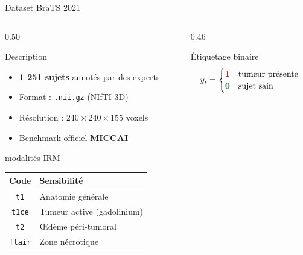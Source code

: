\documentclass[aspectratio=169, 12pt]{beamer}
\begin{document}
\begin{frame}{Dataset BraTS 2021}
  \begin{columns}[T]

    \begin{column}{0.50\textwidth}
      \begin{block}{\faDatabase\; Description}
        \begin{itemize}
          \item \textbf{1 251 sujets} annotés par des experts
          \item Format : \texttt{.nii.gz} (NIfTI 3D)
          \item Résolution : $240 \times 240 \times 155$ voxels
          \item Benchmark officiel \textbf{MICCAI}
        \end{itemize}
      \end{block}

      \vspace{0.4em}
      \begin{block}{\faLayerGroup{} modalités IRM}
        \small
        \begin{tabular}{@{}cl@{}}
          \toprule
          \textbf{Code} & \textbf{Sensibilité} \\
          \midrule
          \texttt{t1}    & Anatomie générale \\
          \texttt{t1ce}  & Tumeur active (gadolinium) \\
          \texttt{t2}    & Œdème péri-tumoral \\
          \texttt{flair} & Zone nécrotique \\
          \bottomrule
        \end{tabular}
      \end{block}
    \end{column}

    \begin{column}{0.46\textwidth}
      \begin{block}{\faTags\; Étiquetage binaire}
        \[
          y_i =
          \begin{cases}
            \textcolor{red!70!black}{\mathbf{1}} & \text{tumeur présente} \\
            \textcolor{codeGreen!60!black}{\mathbf{0}} & \text{sujet sain}
          \end{cases}
        \]
      \end{block}


\end{column}
\end{columns}
\end{frame}
\end{document}
